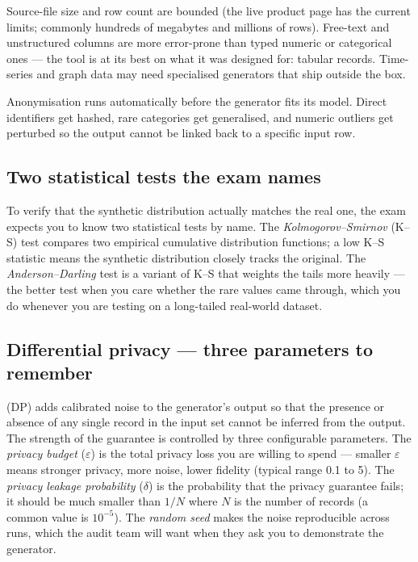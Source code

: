 Source-file size and row count are bounded (the live product page has the current limits; commonly hundreds of megabytes and millions of rows). Free-text and unstructured columns are more error-prone than typed numeric or categorical ones --- the tool is at its best on what it was designed for: tabular records. Time-series and graph data may need specialised generators that ship outside the box.

Anonymisation runs automatically before the generator fits its model. Direct identifiers get hashed, rare categories get generalised, and numeric outliers get perturbed so the output cannot be linked back to a specific input row.

\subsection{Two statistical tests the exam names}

To verify that the synthetic distribution actually matches the real one, the exam expects you to know two statistical tests by name. The \emph{Kolmogorov--Smirnov} (K--S) test compares two empirical cumulative distribution functions; a low K--S statistic means the synthetic distribution closely tracks the original. The \emph{Anderson--Darling} test is a variant of K--S that weights the tails more heavily --- the better test when you care whether the rare values came through, which you do whenever you are testing on a long-tailed real-world dataset.

\subsection{Differential privacy --- three parameters to remember}

 (DP) adds calibrated noise to the generator's output so that the presence or absence of any single record in the input set cannot be inferred from the output. The strength of the guarantee is controlled by three configurable parameters. The \emph{privacy budget} ($\varepsilon$) is the total privacy loss you are willing to spend --- smaller $\varepsilon$ means stronger privacy, more noise, lower fidelity (typical range 0.1 to 5). The \emph{privacy leakage probability} ($\delta$) is the probability that the privacy guarantee fails; it should be much smaller than $1/N$ where $N$ is the number of records (a common value is $10^{-5}$). The \emph{random seed} makes the noise reproducible across runs, which the audit team will want when they ask you to demonstrate the generator.


